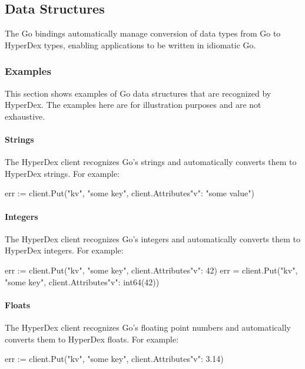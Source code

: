 \subsection{Data Structures}
\label{sec:api:go-client:data-structures}

The Go bindings automatically manage conversion of data types from Go to
HyperDex types, enabling applications to be written in idiomatic Go.

\subsubsection{Examples}
\label{sec:api:go-client:examples}

This section shows examples of Go data structures that are recognized by
HyperDex.  The examples here are for illustration purposes and are not
exhaustive.

\paragraph{Strings}

The HyperDex client recognizes Go's strings and automatically converts them to
HyperDex strings.  For example:

\begin{gocode}
err := client.Put("kv", "some key", client.Attributes{"v": "some value"})
\end{gocode}

\paragraph{Integers}

The HyperDex client recognizes Go's integers and automatically converts them to
HyperDex integers.  For example:

\begin{gocode}
err := client.Put("kv", "some key", client.Attributes{"v": 42})
err = client.Put("kv", "some key", client.Attributes{"v": int64(42)})
\end{gocode}

\paragraph{Floats}

The HyperDex client recognizes Go's floating point numbers and automatically
converts them to HyperDex floats.  For example:

\begin{gocode}
err := client.Put("kv", "some key", client.Attributes{"v": 3.14})
\end{gocode}


